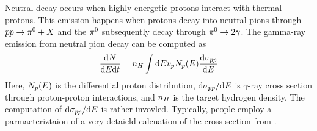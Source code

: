 Neutral \pion decay occurs when highly-energetic protons interact with
thermal protons. This
emission happens when protons decay into neutral pions through $pp \rightarrow
{\pi}^0 + X$ and the ${\pi}^0$ subsequently decay through ${\pi}^0 \rightarrow 2\gamma$.
The gamma-ray emission from neutral pion decay can be computed
as
\begin{equation}
  \frac{\text{d}N}{\text{d}E\text{d}t} = 
  n_H \int \text{d}E v_p N_p(E) 
  \frac{\text{d}\sigma_{pp}}{\text{d}E}
\end{equation}
Here, $N_p(E)$
is the differential proton distribution,
$\text{d}\sigma_{pp}/\text{d}E$
is $\gamma$-ray cross section through proton-proton interactions, and
$n_H$ is the target hydrogen density.  The computation
of $\text{d}\sigma_{pp}/\text{d}E$ is
rather invovled. Typically, people employ a parmaeteriztaion of 
a very detaield calcuation of the cross section 
from \cite{kamae_2006a_parameterization-gamma}.
